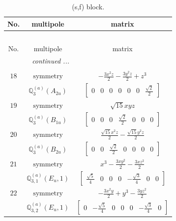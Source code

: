 \documentclass[fleqn,8pt,landscape]{jsarticle}
\begin{document}
\begin{longtable}{ccc}
\caption{(s,f) block.}
 \\
 \hline \hline
No. & multipole & matrix \\ \hline \endfirsthead

\multicolumn{2}{l}{\tablename\ \thetable{}} \\
 \hline \hline
No. & multipole & matrix \\ \hline \endhead

 \hline \hline
\multicolumn{2}{r}{\footnotesize\it continued ...} \\ \endfoot

 \hline \hline
\multicolumn{2}{r}{} \\ \endlastfoot

$ 18 $ & $ \text{symmetry} $ & $ - \frac{3 x^{2} z}{2} - \frac{3 y^{2} z}{2} + z^{3} $ \\
$  $ & $ \mathbb{Q}_{3}^{(a)}(A_{2u}) $ & $ \begin{bmatrix} 0 & 0 & 0 & 0 & 0 & 0 & \frac{\sqrt{2}}{2} \end{bmatrix} $ \\ \hline
$ 19 $ & $ \text{symmetry} $ & $ \sqrt{15} x y z $ \\
$  $ & $ \mathbb{Q}_{3}^{(a)}(B_{1u}) $ & $ \begin{bmatrix} 0 & 0 & 0 & \frac{\sqrt{2}}{2} & 0 & 0 & 0 \end{bmatrix} $ \\ \hline
$ 20 $ & $ \text{symmetry} $ & $ \frac{\sqrt{15} x^{2} z}{2} - \frac{\sqrt{15} y^{2} z}{2} $ \\
$  $ & $ \mathbb{Q}_{3}^{(a)}(B_{2u}) $ & $ \begin{bmatrix} 0 & 0 & \frac{\sqrt{2}}{2} & 0 & 0 & 0 & 0 \end{bmatrix} $ \\ \hline
$ 21 $ & $ \text{symmetry} $ & $ x^{3} - \frac{3 x y^{2}}{2} - \frac{3 x z^{2}}{2} $ \\
$  $ & $ \mathbb{Q}_{3,1}^{(a)}(E_{u},1) $ & $ \begin{bmatrix} \frac{\sqrt{5}}{4} & 0 & 0 & 0 & - \frac{\sqrt{3}}{4} & 0 & 0 \end{bmatrix} $ \\ \hline
$ 22 $ & $ \text{symmetry} $ & $ - \frac{3 x^{2} y}{2} + y^{3} - \frac{3 y z^{2}}{2} $ \\
$  $ & $ \mathbb{Q}_{3,2}^{(a)}(E_{u},1) $ & $ \begin{bmatrix} 0 & - \frac{\sqrt{5}}{4} & 0 & 0 & 0 & - \frac{\sqrt{3}}{4} & 0 \end{bmatrix} $ \\ \hline

\end{longtable}
\end{document}
